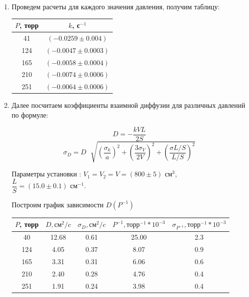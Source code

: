 \documentclass[a4paper,12pt]{article}
\theoremstyle{definition}
\begin{document}
\begin{enumerate}
\item Проведем расчеты для каждого значения давления, получим таблицу:
\def\arraystretch{1.3}%
\begin{table}[H]
	\centering
	\begin{tabular}{|c|c|}
		\hline
		$ P $, торр & $ k $, с$ ^{-1} $        \\ \hline
		41          & $ (-0.0259 \pm 0.004 ) $ \\ \hline
		124         & $ (-0.0047 \pm 0.0003) $ \\ \hline
		165         & $ (-0.0058 \pm 0.0004) $ \\ \hline
		210         & $ (-0.0074 \pm 0.0006) $ \\ \hline
		251         & $ (-0.0064 \pm 0.0006) $ \\ \hline
	\end{tabular}
\end{table}

\item Далее посчитаем коэффициенты взаимной диффузии для различных давлений по формуле:

\[
	D = -\frac{kVL}{2S}
\]
\[
	\sigma_D = D \,\, \sqrt[]{(\frac{\sigma_k}{a})^2 + (\frac{3\sigma_V}{2V})^2 + (\frac{\sigma{L/S}}{L/S})^2}
\]


Параметры установки : $V_1 = V_2 = V = (800\pm 5)\text{ см}^3$, $\dfrac{L}{S} = (15.0\pm 0.1)\text{ см}^{-1}$.

Построим график зависимости $D(P^{-1})$

\begin{table}[H]
	\centering
	\begin{tabular}{|c|c|c|c|c|}
		\hline
		$P$, торр & $D, \text{см}^2/c$ & $\sigma_D, \text{см}^2/c$ & $P^{-1}, \text{торр}^{-1}*10^{-3}$ & $\sigma_{P^{-1}}, \text{торр}^{-1}*10^{-3}$ \\ \hline
		40        & 12.68              & 0.61                      & 25.00                              & 2.3                                         \\ \hline
		124       & 4.05               & 0.37                      & 8.07                               & 0.9                                         \\ \hline
		165       & 3.31               & 0.31                      & 6.06                               & 0.6                                         \\ \hline
		210       & 2.40               & 0.28                      & 4.76                               & 0.4                                         \\ \hline
		251       & 1.91               & 0.24                      & 3.98                               & 0.4                                         \\ \hline
	\end{tabular}
\end{table}


\end{enumerate}
\end{document}

